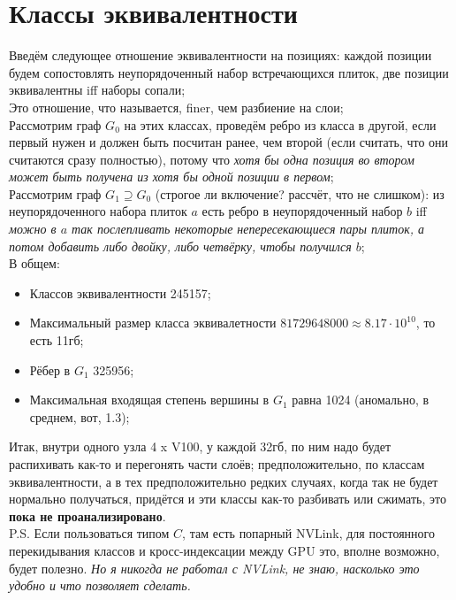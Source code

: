 \documentclass[12pt]{article}
\begin{document}
\section{Классы эквивалентности}
Введём следующее отношение эквивалентности на позициях: каждой позиции будем сопостовлять неупорядоченный набор встречающихся плиток, две позиции эквивалентны iff наборы сопали;\\
Это отношение, что называется, finer, чем разбиение на слои;\\
Рассмотрим граф $G_0$ на этих классах, проведём ребро из класса в другой, если первый нужен и должен быть посчитан ранее, чем второй (если считать, что они считаются сразу полностью), потому что \textit{хотя бы одна позиция во втором может быть получена из хотя бы одной позиции в первом};\\
Рассмотрим граф $G_1 \supseteq G_0$ (строгое ли включение? рассчёт, что не слишком): из неупорядоченного набора плиток $a$ есть ребро в неупорядоченный набор $b$ iff \textit{можно в $a$ так послепливать некоторые непересекающиеся пары плиток, а потом добавить либо двойку, либо четвёрку, чтобы получился $b$};\\
В общем:
\begin{itemize}
  \item Классов эквивалентности 245157;
  \item Максимальный размер класса эквивалетности $81729648000 \approx 8.17 \cdot 10^{10}$, то есть 11гб;
  \item Рёбер в $G_1$ 325956;
  \item Максимальная входящая степень вершины в $G_1$ равна 1024 (аномально, в среднем, вот, 1.3);
\end{itemize}
Итак, внутри одного узла 4 x V100, у каждой 32гб, по ним надо будет распихивать как-то и перегонять части слоёв; предположительно, по классам эквивалентности, а в тех предположительно редких случаях, когда так не будет нормально получаться, придётся и эти классы как-то разбивать или сжимать, это \textbf{пока не проанализировано}.\\
P.S. Если пользоваться типом $C$, там есть попарный NVLink, для постоянного перекидывания классов и кросс-индексации между GPU это, вполне возможно, будет полезно. \textit{Но я никогда не работал с NVLink, не знаю, насколько это удобно и что позволяет сделать.}
\clearpage
\end{document}
